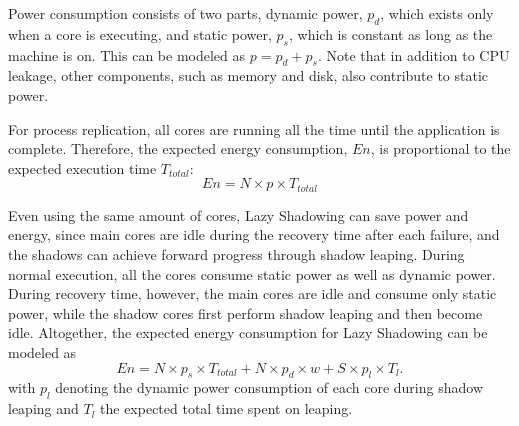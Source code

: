 Power consumption consists of two parts, dynamic power, $p_d$, which exists only when a core is executing, and static power, $p_s$, which is constant as long as the machine is on. This can be modeled as $p = p_d + p_s$. Note that in addition to CPU leakage, other components, such as memory and disk, also contribute to static power. 

For process replication, all cores are running all the time until the application is complete. Therefore, the expected energy consumption, $En$, is proportional to the expected execution time $T_{total}$: 
\begin{equation}
En = N \times p \times T_{total}
\label{eq:exp_energy1}
\end{equation} 

Even using the same amount of cores, Lazy Shadowing can save power and energy, since main cores are idle during the recovery time after each failure, and the shadows can achieve forward progress through shadow leaping. During normal execution, all the cores consume static power as well as dynamic power. During recovery time, however, the main cores are idle and consume only static power, while the shadow cores first perform shadow leaping and then become idle. Altogether, the expected energy consumption for Lazy Shadowing can be modeled as 
\begin{equation}
En = N \times p_s \times T_{total} + N \times p_d \times w + S \times p_{l} \times T_l.
\label{eq:exp_energy2}
\end{equation}
with $p_{l}$ denoting the dynamic power consumption of each core during shadow leaping and $T_l$ the expected total time spent on leaping. %

